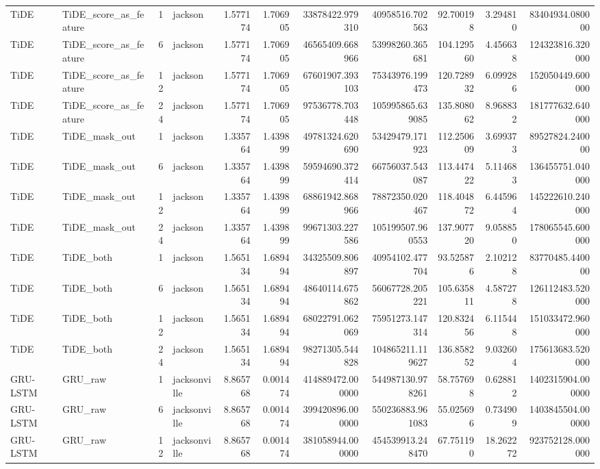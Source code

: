 \begin{longtable}{llrlrrrrrrr}
TiDE & TiDE\_score\_as\_feature & 1 & jackson & 1.577174 & 1.706905 & 33878422.979310 & 40958516.702563 & 92.700198 & 3.294810 & 83404934.080000 \\
TiDE & TiDE\_score\_as\_feature & 6 & jackson & 1.577174 & 1.706905 & 46565409.668966 & 53998260.365681 & 104.129560 & 4.456638 & 124323816.320000 \\
TiDE & TiDE\_score\_as\_feature & 12 & jackson & 1.577174 & 1.706905 & 67601907.393103 & 75343976.199473 & 120.728932 & 6.099286 & 152050449.600000 \\
TiDE & TiDE\_score\_as\_feature & 24 & jackson & 1.577174 & 1.706905 & 97536778.703448 & 105995865.639085 & 135.808062 & 8.968832 & 181777632.640000 \\
TiDE & TiDE\_mask\_out & 1 & jackson & 1.335764 & 1.439899 & 49781324.620690 & 53429479.171923 & 112.250609 & 3.699373 & 89527824.240000 \\
TiDE & TiDE\_mask\_out & 6 & jackson & 1.335764 & 1.439899 & 59594690.372414 & 66756037.543087 & 113.447422 & 5.114683 & 136455751.040000 \\
TiDE & TiDE\_mask\_out & 12 & jackson & 1.335764 & 1.439899 & 68861942.868966 & 78872350.020467 & 118.404872 & 6.445964 & 145222610.240000 \\
TiDE & TiDE\_mask\_out & 24 & jackson & 1.335764 & 1.439899 & 99671303.227586 & 105199507.960553 & 137.907720 & 9.058850 & 178065545.600000 \\
TiDE & TiDE\_both & 1 & jackson & 1.565134 & 1.689494 & 34325509.806897 & 40954102.477704 & 93.525876 & 2.102128 & 83770485.440000 \\
TiDE & TiDE\_both & 6 & jackson & 1.565134 & 1.689494 & 48640114.675862 & 56067728.205221 & 105.635811 & 4.587278 & 126112483.520000 \\
TiDE & TiDE\_both & 12 & jackson & 1.565134 & 1.689494 & 68022791.062069 & 75951273.147314 & 120.832456 & 6.115448 & 151033472.960000 \\
TiDE & TiDE\_both & 24 & jackson & 1.565134 & 1.689494 & 98271305.544828 & 104865211.119627 & 136.858252 & 9.032604 & 175613683.520000 \\
GRU-LSTM & GRU\_raw & 1 & jacksonville & 8.865768 & 0.001474 & 414889472.000000 & 544987130.978261 & 58.757698 & 0.628812 & 1402315904.000000 \\
GRU-LSTM & GRU\_raw & 6 & jacksonville & 8.865768 & 0.001474 & 399420896.000000 & 550236883.961083 & 55.025696 & 0.734909 & 1403845504.000000 \\
GRU-LSTM & GRU\_raw & 12 & jacksonville & 8.865768 & 0.001474 & 381058944.000000 & 454539913.248470 & 67.751190 & 18.262272 & 923752128.000000 \\

\end{longtable}
